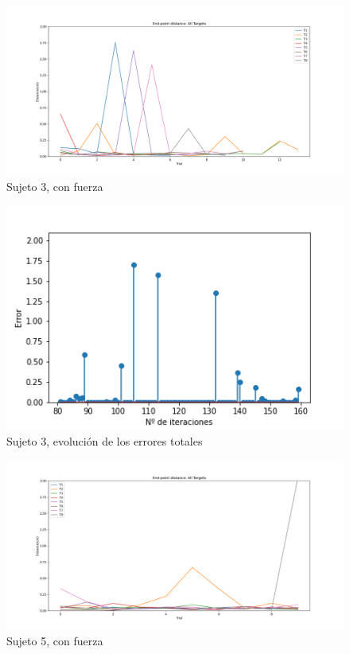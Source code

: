 \documentclass[a4paper,11pt, oneside]{book}
\begin{document}
\begin{figure}[H]
	\includegraphics[width=\linewidth]{sujeto3/force/evolution_distance}
	\caption{Sujeto 3, con fuerza}
	\label{3-2-2}
\end{figure}
\begin{figure}[H]
	\includegraphics[width=\linewidth]{sujeto3/force/resumen_total}
	\caption{Sujeto 3, evolución de los errores totales}
	\label{3-2-7}
\end{figure}

\begin{figure}[H]
	\includegraphics[width=\linewidth]{sujeto5/force/evolution_distance}
	\caption{Sujeto 5, con fuerza}
	\label{5-2-2}
\end{figure}
\end{document}
